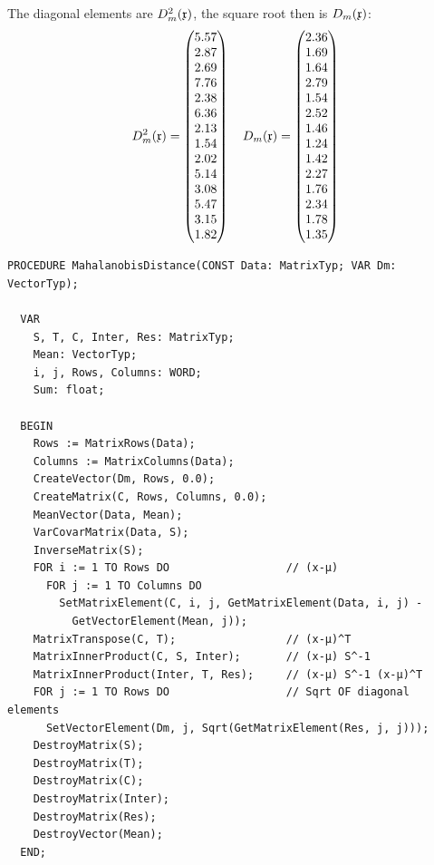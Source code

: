 \begin{refsection}
The diagonal elements are \(D_m^2(\mathfrak{x}) \), the square root then is \(D_m(\mathfrak{x}) \):
\begin{gather} D_m^2(\mathfrak{x}) =
  \begin{pmatrix}
     5.57 \\
     2.87 \\
     2.69 \\
     7.76 \\
     2.38 \\
     6.36 \\
     2.13 \\
     1.54 \\
     2.02 \\
     5.14 \\
     3.08 \\
     5.47 \\
     3.15 \\
     1.82
  \end{pmatrix}
  \quad D_m(\mathfrak{x}) =
  \begin{pmatrix}
     2.36 \\
     1.69 \\
     1.64 \\
     2.79 \\
     1.54 \\
     2.52 \\
     1.46 \\
     1.24 \\
     1.42 \\
     2.27 \\
     1.76 \\
     2.34 \\
     1.78 \\
     1.35
  \end{pmatrix}
\end{gather}


\begin{lstlisting}[caption=\Name{Mahalanobis} distance]
  PROCEDURE MahalanobisDistance(CONST Data: MatrixTyp; VAR Dm: VectorTyp);

  VAR
    S, T, C, Inter, Res: MatrixTyp;
    Mean: VectorTyp;
    i, j, Rows, Columns: WORD;
    Sum: float;

  BEGIN
    Rows := MatrixRows(Data);
    Columns := MatrixColumns(Data);
    CreateVector(Dm, Rows, 0.0);
    CreateMatrix(C, Rows, Columns, 0.0);
    MeanVector(Data, Mean);
    VarCovarMatrix(Data, S);
    InverseMatrix(S);
    FOR i := 1 TO Rows DO                  // (x-µ)
      FOR j := 1 TO Columns DO
        SetMatrixElement(C, i, j, GetMatrixElement(Data, i, j) -
          GetVectorElement(Mean, j));
    MatrixTranspose(C, T);                 // (x-µ)^T
    MatrixInnerProduct(C, S, Inter);       // (x-µ) S^-1
    MatrixInnerProduct(Inter, T, Res);     // (x-µ) S^-1 (x-µ)^T
    FOR j := 1 TO Rows DO                  // Sqrt OF diagonal elements
      SetVectorElement(Dm, j, Sqrt(GetMatrixElement(Res, j, j)));
    DestroyMatrix(S);
    DestroyMatrix(T);
    DestroyMatrix(C);
    DestroyMatrix(Inter);
    DestroyMatrix(Res);
    DestroyVector(Mean);
  END;
\end{lstlisting}


\end{refsection}
